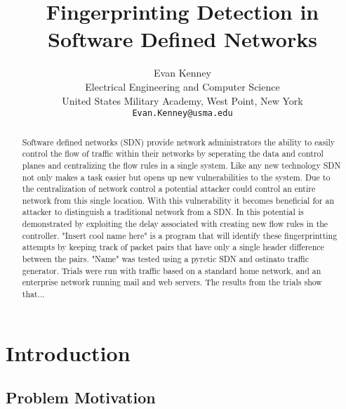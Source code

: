 \documentclass[twocolumn]{article}
\begin{document}
\title{Fingerprinting Detection in Software Defined Networks}
\author{Evan Kenney\\
	Electrical Engineering and Computer Science\\
	United States Military Academy, West Point, New York\\
	\texttt{Evan.Kenney@usma.edu}}
\maketitle

\begin{abstract}

Software defined networks (SDN) provide network administrators the ability to easily control the flow of traffic within their networks by seperating the data and control planes and centralizing the flow rules in a single system. Like any new technology SDN not only makes a task easier but opens up new vulnerabilities to the system. Due to the centralization of network control a potential attacker could control an entire network from this single location. With this vulnerability it becomes beneficial for an attacker to distinguish a traditional network from a SDN. In \cite{Gu13} this potential is demonstrated by exploiting the delay associated with creating new flow rules in the controller. "Insert cool name here" is a program that will identify these fingerprintting attempts by keeping track of packet pairs that have only a single header difference between the pairs. "Name" was tested using a pyretic SDN and ostinato traffic generator. Trials were run with traffic based on a standard home network, and an enterprise network running mail and web servers. The results from the trials show that...

\end{abstract}

\section{Introduction}
\subsection{Problem Motivation}
\end{document}
